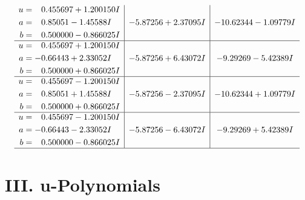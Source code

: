 \documentclass[1p]{elsarticle_modified}
\theoremstyle{definition}
\begin{document}
$$\begin{array}{c|c|c}
\begin{aligned}
u &= \phantom{-}0.455697 + 1.200150 I \\
a &= \phantom{-}0.85051 - 1.45588 I \\
b &= \phantom{-}0.500000 - 0.866025 I\end{aligned}
 & -5.87256 + 2.37095 I & -10.62344 - 1.09779 I \\ \hline\begin{aligned}
u &= \phantom{-}0.455697 + 1.200150 I \\
a &= -0.66443 + 2.33052 I \\
b &= \phantom{-}0.500000 + 0.866025 I\end{aligned}
 & -5.87256 + 6.43072 I & -9.29269 - 5.42389 I \\ \hline\begin{aligned}
u &= \phantom{-}0.455697 - 1.200150 I \\
a &= \phantom{-}0.85051 + 1.45588 I \\
b &= \phantom{-}0.500000 + 0.866025 I\end{aligned}
 & -5.87256 - 2.37095 I & -10.62344 + 1.09779 I \\ \hline\begin{aligned}
u &= \phantom{-}0.455697 - 1.200150 I \\
a &= -0.66443 - 2.33052 I \\
b &= \phantom{-}0.500000 - 0.866025 I\end{aligned}
 & -5.87256 - 6.43072 I & -9.29269 + 5.42389 I\\
 \hline 
 \end{array}$$\newpage
\newpage\renewcommand{\arraystretch}{1}
\centering \section*{ III. u-Polynomials}
\end{document}
